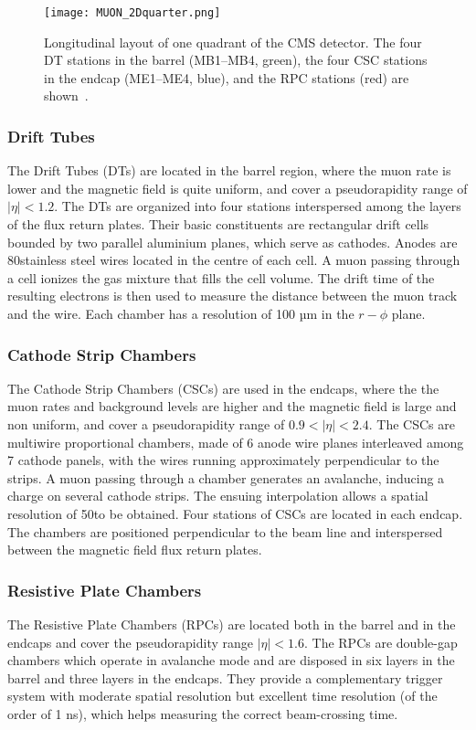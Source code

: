 \begin{figure}[thb]
  \centering
  \texttt{[image: MUON\_2Dquarter.png]}
  \caption{Longitudinal layout of one quadrant of the CMS detector.
    The four DT stations in the barrel (MB1–MB4, green),
    the four CSC stations in the endcap (ME1–ME4, blue),
    and the RPC stations (red) are shown~\cite{CMS-MUO-10-004}.}
  \label{fig:MUON_2Dquarter}
\end{figure}

\subsubsection{Drift Tubes}
The Drift Tubes (DTs) are located in the barrel region, where the muon rate is lower and the magnetic field is quite uniform,
and cover a pseudorapidity range of $|\eta| < 1.2$.
The DTs are organized into four stations interspersed among the layers of the flux return plates.
Their basic constituents are rectangular drift cells bounded by two parallel aluminium planes, which serve as cathodes.
Anodes are 80\mum stainless steel wires located in the centre of each cell.
A muon passing through a cell ionizes the gas mixture that fills the cell volume.
The drift time of the resulting electrons is then used to measure the distance between the muon track and the wire.
Each chamber has a resolution of 100 µm in the $r - \phi$ plane.

\subsubsection{Cathode Strip Chambers}
The Cathode Strip Chambers (CSCs) are used in the endcaps, where the the muon rates and background levels are higher and the magnetic field is large and non uniform,
and cover a pseudorapidity range of $0.9 < |\eta| < 2.4$.
The CSCs are multiwire proportional chambers, made of 6 anode wire planes interleaved among 7 cathode panels,
with the wires running approximately perpendicular to the strips.
A muon passing through a chamber generates an avalanche, inducing a charge on several cathode strips.
The ensuing interpolation allows a spatial resolution of 50\mum to be obtained.
Four stations of CSCs are located in each endcap.
The chambers are positioned perpendicular to the beam line and interspersed between the magnetic field flux return plates.

\subsubsection{Resistive Plate Chambers}
The Resistive Plate Chambers (RPCs) are located both in the barrel and in the endcaps and cover the pseudorapidity range $|\eta| < 1.6$.
The RPCs are double-gap chambers which operate in avalanche mode and are disposed in six layers in the barrel and three layers in the endcaps.
They provide a complementary trigger system with moderate spatial resolution but excellent time resolution (of the order of 1 ns),
which helps measuring the correct beam-crossing time.

